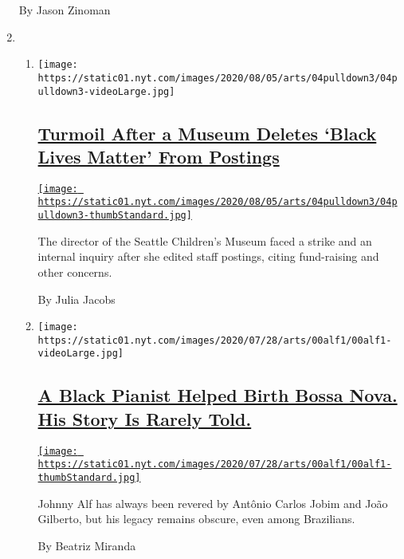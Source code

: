 \begin{enumerate}
  By Jason Zinoman
\item
  \begin{enumerate}
  \def\labelenumii{\arabic{enumii}.}
  \item
    \texttt{[image: https://static01.nyt.com/images/2020/08/05/arts/04pulldown3/04pulldown3-videoLarge.jpg]}

    \hypertarget{turmoil-after-a-museum-deletes-black-lives-matter-from-postings}{%
    \subsection{\texorpdfstring{\href{/2020/08/04/arts/design/seattle-childrens-museum.html}{Turmoil
    After a Museum Deletes `Black Lives Matter' From
    Postings}}{Turmoil After a Museum Deletes `Black Lives Matter' From Postings}}\label{turmoil-after-a-museum-deletes-black-lives-matter-from-postings}}

    \href{/2020/08/04/arts/design/seattle-childrens-museum.html}{\texttt{[image: https://static01.nyt.com/images/2020/08/05/arts/04pulldown3/04pulldown3-thumbStandard.jpg]}}

    The director of the Seattle Children's Museum faced a strike and an
    internal inquiry after she edited staff postings, citing
    fund-raising and other concerns.

    By Julia Jacobs
  \item
    \texttt{[image: https://static01.nyt.com/images/2020/07/28/arts/00alf1/00alf1-videoLarge.jpg]}

    \hypertarget{a-black-pianist-helped-birth-bossa-nova-his-story-is-rarely-told}{%
    \subsection{\texorpdfstring{\href{/2020/08/04/arts/music/johnny-alf-bossa-nova.html}{A
    Black Pianist Helped Birth Bossa Nova. His Story Is Rarely
    Told.}}{A Black Pianist Helped Birth Bossa Nova. His Story Is Rarely Told.}}\label{a-black-pianist-helped-birth-bossa-nova-his-story-is-rarely-told}}

    \href{/2020/08/04/arts/music/johnny-alf-bossa-nova.html}{\texttt{[image: https://static01.nyt.com/images/2020/07/28/arts/00alf1/00alf1-thumbStandard.jpg]}}

    Johnny Alf has always been revered by Antônio Carlos Jobim and João
    Gilberto, but his legacy remains obscure, even among Brazilians.

    By Beatriz Miranda
  \end{enumerate}
\end{enumerate}

